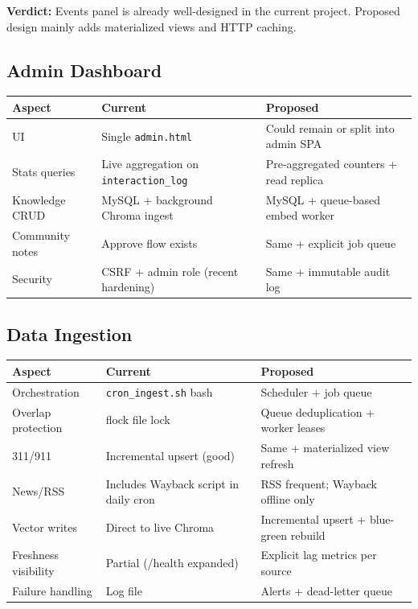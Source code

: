 \documentclass[11pt,a4paper]{article}
\begin{document}
\textbf{Verdict:} Events panel is already well-designed in the current project. Proposed design mainly adds materialized views and HTTP caching.

\subsection{Admin Dashboard}

\begin{longtable}{@{}p{3.2cm}p{5.3cm}p{5.3cm}@{}}
\toprule
\textbf{Aspect} & \textbf{Current} & \textbf{Proposed} \\
\midrule
\endhead
UI & Single \texttt{admin.html} & Could remain or split into admin SPA \\
Stats queries & Live aggregation on \texttt{interaction\_log} & Pre-aggregated counters + read replica \\
Knowledge CRUD & MySQL + background Chroma ingest & MySQL + queue-based embed worker \\
Community notes & Approve flow exists & Same + explicit job queue \\
Security & CSRF + admin role (recent hardening) & Same + immutable audit log \\
\bottomrule
\end{longtable}

\subsection{Data Ingestion}

\begin{longtable}{@{}p{3.2cm}p{5.3cm}p{5.3cm}@{}}
\toprule
\textbf{Aspect} & \textbf{Current} & \textbf{Proposed} \\
\midrule
\endhead
Orchestration & \texttt{cron\_ingest.sh} bash & Scheduler + job queue \\
Overlap protection & flock file lock & Queue deduplication + worker leases \\
311/911 & Incremental upsert (good) & Same + materialized view refresh \\
News/RSS & Includes Wayback script in daily cron & RSS frequent; Wayback offline only \\
Vector writes & Direct to live Chroma & Incremental upsert + blue-green rebuild \\
Freshness visibility & Partial (/health expanded) & Explicit lag metrics per source \\
Failure handling & Log file & Alerts + dead-letter queue \\
\bottomrule
\end{longtable}
\end{document}
